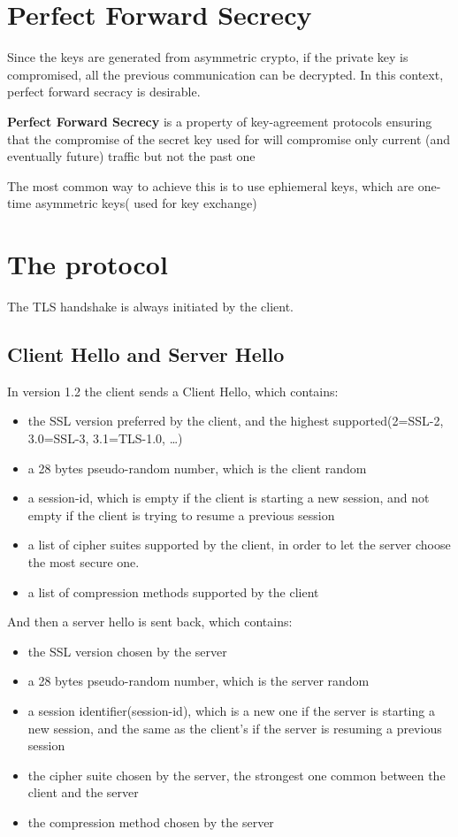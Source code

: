 \documentclass{report}
\begin{document}
\section{Perfect Forward Secrecy}
Since the keys are generated from asymmetric crypto, if the private
key is compromised, all the previous communication can be decrypted.
In this context, perfect forward secracy is desirable.
\begin{boxH}
  \textbf{Perfect Forward Secrecy} is a property of key-agreement
  protocols ensuring that the compromise of the secret key used for 
  will compromise only current (and eventually future) traffic but not
  the past one
\end{boxH}
The most common way to achieve this is to use ephiemeral keys, which
are one-time asymmetric keys( used for key exchange) 

\section{The protocol}
The TLS handshake is always initiated by the client. 

\subsection{Client Hello and Server Hello}
In version 1.2 the client sends a Client Hello, which contains:
\begin{itemize}
  \item the SSL version preferred by the client, and the highest
    supported(2=SSL-2, 3.0=SSL-3, 3.1=TLS-1.0, \dots)
  \item a 28 bytes pseudo-random number, which is the client random
  \item a session-id, which is empty if the client is starting a new
    session, and not empty if the client is trying to resume a 
    previous session
  \item a list of cipher suites supported by the client, in order to 
    let the server choose the most secure one.
  \item a list of compression methods supported by the client
\end{itemize}

And then a server hello is sent back, which contains:
\begin{itemize}
  \item the SSL version chosen by the server
  \item a 28 bytes pseudo-random number, which is the server random
  \item a session identifier(session-id), which is a new one if the
    server is starting a new session, and the same as the client's if
    the server is resuming a previous session
  \item the cipher suite chosen by the server, the strongest one
    common between the client and the server
  \item the compression method chosen by the server
\end{itemize}
\end{document}
